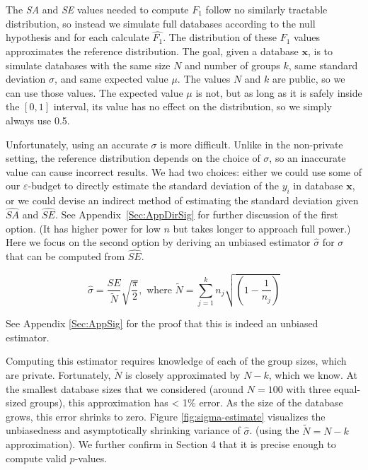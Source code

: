 \documentclass[USenglish,oneside]{article}
\newcounter{ab}
\newcounter{ar}
\newcounter{igh}
\newcommand{\eps}{\ensuremath{\varepsilon}\xspace}
\newcommand{\se}{\textit{SE}\xspace}
\newcommand{\sa}{\textit{SA}\xspace}
\newcommand{\x}{\ensuremath{\mathbf{x}}\xspace}
\begin{document}
The \sa and \se values needed to compute $F_1$ follow no similarly tractable distribution, so instead we simulate full databases according to the null hypothesis and for each calculate $\widehat{F_1}$.  The distribution of these $\widehat{F_1}$ values approximates the reference distribution.  The goal, given a database \x, is to simulate databases with the same size $N$ and number of groups $k$, same standard deviation $\sigma$, and same expected value $\mu$.  The values $N$ and $k$ are public, so we can use those values.  The expected value $\mu$ is not, but as long as it is safely inside the $[0,1]$ interval, its value has no effect on the distribution, so we simply always use 0.5. 

Unfortunately, using an accurate $\sigma$ is more difficult.  Unlike in the non-private setting, the reference distribution depends on the choice of $\sigma$, so an inaccurate value can cause incorrect results.  We had two choices: either we could use some of our \eps-budget to directly estimate the standard deviation of the $y_i$ in database \x, or we could devise an indirect method of estimating the standard deviation given $\widehat{\sa}$ and $\widehat{\se}$. See Appendix~\ref{Sec:AppDirSig} for further discussion of the first option.  (It has higher power for low $n$ but takes longer to approach full power.)  Here we focus on the second option by deriving an unbiased estimator $\hat{\sigma}$ for $\sigma$ that can be computed from $\widehat{\se}$.

$$
\hat{\sigma} = \frac{\widehat{SE}}{\tilde{N}}\sqrt{\frac{\pi}{2}}, \text{ where } \tilde{N} = \sum_{j=1}^k n_j \sqrt{\left(1 - \frac{1}{n_j}\right)}
$$

See Appendix \ref{Sec:AppSig} for the proof that this is indeed an unbiased estimator.  

Computing this estimator requires knowledge of each of the group sizes, which are private. Fortunately, $\tilde{N}$ is closely approximated by $N-k$, which we know. At the smallest database sizes that we considered (around $N = 100$ with three equal-sized groups), this approximation has < 1\% error. As the size of the database grows, this error shrinks to zero.  Figure \ref{fig:sigma-estimate} visualizes the unbiasedness and asymptotically shrinking variance of $\hat{\sigma}$. (using the $\tilde{N} = N-k$ approximation).  We further confirm in Section 4 that it is precise enough to compute valid $p$-values. 
\end{document}
